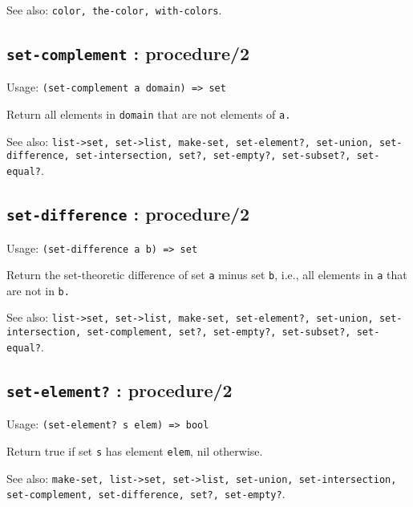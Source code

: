 \documentclass[
]{article}
\newcommand{\passthrough}[1]{#1}
\begin{document}
See also: \passthrough{\lstinline!color, the-color, with-colors!}.

\hypertarget{set-complement-procedure2-1}{%
\subsection{\texorpdfstring{\texttt{set-complement} :
procedure/2}{set-complement : procedure/2}}\label{set-complement-procedure2-1}}

Usage: \passthrough{\lstinline!(set-complement a domain) => set!}

Return all elements in \passthrough{\lstinline!domain!} that are not
elements of \passthrough{\lstinline!a.!}

See also:
\passthrough{\lstinline!list->set, set->list, make-set, set-element?, set-union, set-difference, set-intersection, set?, set-empty?, set-subset?, set-equal?!}.

\hypertarget{set-difference-procedure2-1}{%
\subsection{\texorpdfstring{\texttt{set-difference} :
procedure/2}{set-difference : procedure/2}}\label{set-difference-procedure2-1}}

Usage: \passthrough{\lstinline!(set-difference a b) => set!}

Return the set-theoretic difference of set \passthrough{\lstinline!a!}
minus set \passthrough{\lstinline!b!}, i.e., all elements in
\passthrough{\lstinline!a!} that are not in \passthrough{\lstinline!b.!}

See also:
\passthrough{\lstinline!list->set, set->list, make-set, set-element?, set-union, set-intersection, set-complement, set?, set-empty?, set-subset?, set-equal?!}.

\hypertarget{set-element-procedure2-1}{%
\subsection{\texorpdfstring{\texttt{set-element?} :
procedure/2}{set-element? : procedure/2}}\label{set-element-procedure2-1}}

Usage: \passthrough{\lstinline!(set-element? s elem) => bool!}

Return true if set \passthrough{\lstinline!s!} has element
\passthrough{\lstinline!elem!}, nil otherwise.

See also:
\passthrough{\lstinline!make-set, list->set, set->list, set-union, set-intersection, set-complement, set-difference, set?, set-empty?!}.
\end{document}
